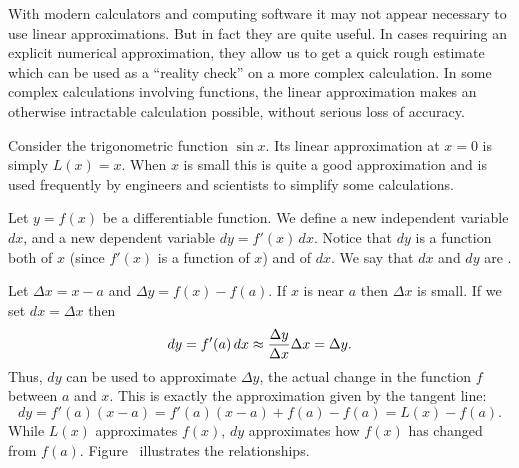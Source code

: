 With modern calculators and computing software it may not appear
necessary to use linear approximations. But in fact they are quite
useful. In cases requiring an explicit numerical approximation, they
allow us to get a quick rough estimate which can be used as a
``reality check'' on a more complex calculation. In some complex
calculations involving functions, the linear approximation makes an
otherwise intractable calculation possible, without serious loss of
accuracy.

\begin{example}
\label{exam:linear approximation of sine}
Consider the trigonometric function $\sin x$. Its linear approximation
at $x=0$ is simply $L(x)=x$. When $x$ is small this is quite a good
approximation and is used frequently by engineers and scientists
to simplify some calculations.
\end{example}

\begin{definition} Let $y=f(x)$ be a differentiable function. We define a new
  independent variable $dx$, and a new dependent variable
  $dy=f'(x)\,dx$. Notice that $dy$ is a function both of $x$ (since
  $f'(x)$ is a function of $x$) and of $dx$.  We say that $dx$ and
  $dy$ are .  
\end{definition}

Let $\Delta x =x-a$ and $\Delta y= f(x)-f(a)$.
If $x$ is near $a$ then $\Delta x$ is small. If we set
$dx=\Delta x$ then 
$$dy = f'(a)\,dx \approx {\Delta y\over\Delta x}\Delta x = \Delta y.$$
Thus, $dy$ can be used to approximate $\Delta y$, the actual change in
the function $f$ between $a$ and $x$. This is exactly the
approximation given by the tangent line:
$$dy = f'(a)(x-a) = f'(a)(x-a)+f(a)-f(a)=L(x)-f(a).$$
While $L(x)$ approximates $f(x)$, $dy$ approximates how $f(x)$ has
changed from $f(a)$.
Figure~ illustrates the relationships.


